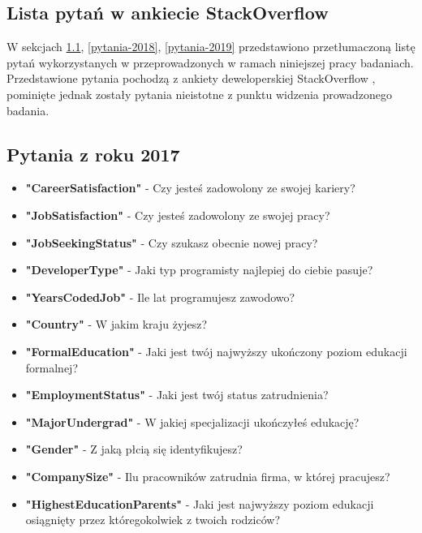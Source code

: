 
\appendix
\begin{appendices}
    \chapter{Lista pytań w ankiecie StackOverflow}\label{app:dod1}

    W sekcjach \ref{pytania-2017}, \ref{pytania-2018}, \ref{pytania-2019} przedstawiono przetłumaczoną listę pytań wykorzystanych w przeprowadzonych w ramach niniejszej pracy badaniach.
    Przedstawione pytania pochodzą z ankiety deweloperskiej StackOverflow \cite{so-survey-info}, pominięte jednak zostały pytania nieistotne z punktu widzenia prowadzonego badania.

    \section{Pytania z roku 2017}\label{pytania-2017}
    \begin{itemize}
        \item \textbf{"CareerSatisfaction"} - Czy jesteś zadowolony ze swojej kariery?
        \item \textbf{"JobSatisfaction"} - Czy jesteś zadowolony ze swojej pracy?
        \item \textbf{"JobSeekingStatus"} - Czy szukasz obecnie nowej pracy?
        \item \textbf{"DeveloperType"} - Jaki typ programisty najlepiej do ciebie pasuje?
        \item \textbf{"YearsCodedJob"} - Ile lat programujesz zawodowo?
        \item \textbf{"Country"} - W jakim kraju żyjesz?
        \item \textbf{"FormalEducation"} - Jaki jest twój najwyższy ukończony poziom edukacji formalnej?
        \item \textbf{"EmploymentStatus"} - Jaki jest twój status zatrudnienia?
        \item \textbf{"MajorUndergrad"} - W jakiej specjalizacji ukończyłeś edukację?
        \item \textbf{"Gender"} - Z jaką płcią się identyfikujesz?
        \item \textbf{"CompanySize"} - Ilu pracowników zatrudnia firma, w której pracujesz?
        \item \textbf{"HighestEducationParents"} - Jaki jest najwyższy poziom edukacji osiągnięty przez któregokolwiek z twoich rodziców?

\end{itemize}
\end{appendices}
